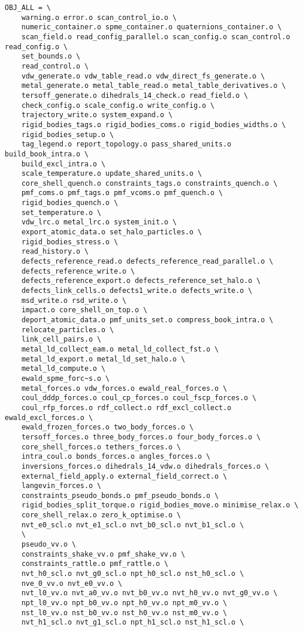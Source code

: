 \begin{verbatim}
OBJ_ALL = \
	warning.o error.o scan_control_io.o \
	numeric_container.o spme_container.o quaternions_container.o \
	scan_field.o read_config_parallel.o scan_config.o scan_control.o read_config.o \
	set_bounds.o \
	read_control.o \
	vdw_generate.o vdw_table_read.o vdw_direct_fs_generate.o \
	metal_generate.o metal_table_read.o metal_table_derivatives.o \
	tersoff_generate.o dihedrals_14_check.o read_field.o \
	check_config.o scale_config.o write_config.o \
	trajectory_write.o system_expand.o \
	rigid_bodies_tags.o rigid_bodies_coms.o rigid_bodies_widths.o \
	rigid_bodies_setup.o \
	tag_legend.o report_topology.o pass_shared_units.o build_book_intra.o \
	build_excl_intra.o \
	scale_temperature.o update_shared_units.o \
	core_shell_quench.o constraints_tags.o constraints_quench.o \
	pmf_coms.o pmf_tags.o pmf_vcoms.o pmf_quench.o \
	rigid_bodies_quench.o \
	set_temperature.o \
	vdw_lrc.o metal_lrc.o system_init.o \
	export_atomic_data.o set_halo_particles.o \
	rigid_bodies_stress.o \
	read_history.o \
	defects_reference_read.o defects_reference_read_parallel.o \
	defects_reference_write.o \
	defects_reference_export.o defects_reference_set_halo.o \
	defects_link_cells.o defects1_write.o defects_write.o \
	msd_write.o rsd_write.o \
	impact.o core_shell_on_top.o \
	deport_atomic_data.o pmf_units_set.o compress_book_intra.o \
	relocate_particles.o \
	link_cell_pairs.o \
	metal_ld_collect_eam.o metal_ld_collect_fst.o \
	metal_ld_export.o metal_ld_set_halo.o \
	metal_ld_compute.o \
	ewald_spme_forc~s.o \
	metal_forces.o vdw_forces.o ewald_real_forces.o \
	coul_dddp_forces.o coul_cp_forces.o coul_fscp_forces.o \
	coul_rfp_forces.o rdf_collect.o rdf_excl_collect.o ewald_excl_forces.o \
	ewald_frozen_forces.o two_body_forces.o \
	tersoff_forces.o three_body_forces.o four_body_forces.o \
	core_shell_forces.o tethers_forces.o \
	intra_coul.o bonds_forces.o angles_forces.o \
	inversions_forces.o dihedrals_14_vdw.o dihedrals_forces.o \
	external_field_apply.o external_field_correct.o \
	langevin_forces.o \
	constraints_pseudo_bonds.o pmf_pseudo_bonds.o \
	rigid_bodies_split_torque.o rigid_bodies_move.o minimise_relax.o \
	core_shell_relax.o zero_k_optimise.o \
	nvt_e0_scl.o nvt_e1_scl.o nvt_b0_scl.o nvt_b1_scl.o \
	\
	pseudo_vv.o \
	constraints_shake_vv.o pmf_shake_vv.o \
	constraints_rattle.o pmf_rattle.o \
	nvt_h0_scl.o nvt_g0_scl.o npt_h0_scl.o nst_h0_scl.o \
	nve_0_vv.o nvt_e0_vv.o \
	nvt_l0_vv.o nvt_a0_vv.o nvt_b0_vv.o nvt_h0_vv.o nvt_g0_vv.o \
	npt_l0_vv.o npt_b0_vv.o npt_h0_vv.o npt_m0_vv.o \
	nst_l0_vv.o nst_b0_vv.o nst_h0_vv.o nst_m0_vv.o \
	nvt_h1_scl.o nvt_g1_scl.o npt_h1_scl.o nst_h1_scl.o \

\end{verbatim}
